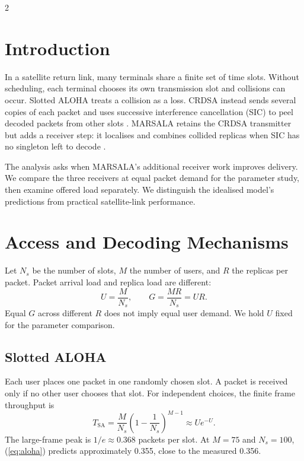 \documentclass[a4paper,10pt]{article}
\begin{document}
\begin{multicols}{2}

\section{Introduction}
In a satellite return link, many terminals share a finite set of time slots.
Without scheduling, each terminal chooses its own transmission slot and
collisions can occur. Slotted ALOHA treats a collision as a loss.
CRDSA instead sends several copies of each packet and uses successive
interference cancellation (SIC) to peel decoded packets from other slots
\cite{casini2007}. MARSALA retains the CRDSA transmitter but adds a receiver
step: it localises and combines collided replicas when SIC has no singleton
left to decode \cite{bui2015}.

The analysis asks when MARSALA's additional receiver work improves delivery.
We compare the three receivers at equal packet demand for the parameter
study, then examine offered load separately. We distinguish the idealised
model's predictions from practical satellite-link performance.

\section{Access and Decoding Mechanisms}
Let $N_s$ be the number of slots, $M$ the number of users, and $R$ the
replicas per packet. Packet arrival load and replica load are different:
\begin{equation}
U=\frac{M}{N_s}, \qquad G=\frac{MR}{N_s}=UR.
\label{eq:loads}
\end{equation}
Equal $G$ across different $R$ does not imply equal user demand. We hold
$U$ fixed for the parameter comparison.

\subsection{Slotted ALOHA}
Each user places one packet in one randomly chosen slot. A packet is received
only if no other user chooses that slot. For independent choices, the finite
frame throughput is
\begin{equation}
T_{\mathrm{SA}}=\frac{M}{N_s}\left(1-\frac{1}{N_s}\right)^{M-1}
\approx Ue^{-U}.
\label{eq:aloha}
\end{equation}
The large-frame peak is $1/e\approx0.368$ packets per slot. At $M=75$ and
$N_s=100$, (\ref{eq:aloha}) predicts approximately 0.355, close to the
measured 0.356.


\end{multicols}
\end{document}
